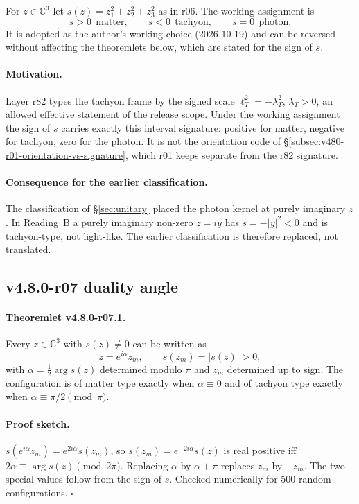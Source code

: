 For \(z\in\mathbb C^3\) let \(s(z)=z_1^2+z_2^2+z_3^2\) as in r06.  The working assignment is
\[
s>0\ \ \text{matter},\qquad s<0\ \ \text{tachyon},\qquad s=0\ \ \text{photon}.
\]
It is adopted as the author's working choice (2026-10-19) and can be reversed without affecting
the theoremlets below, which are stated for the sign of \(s\).

\paragraph{Motivation.}
Layer r82 types the tachyon frame by the signed scale \(\ell_T^2=-\lambda_T^2\), \(\lambda_T>0\),
an allowed effective statement of the release scope.  Under the working assignment the sign of
\(s\) carries exactly this interval signature: positive for matter, negative for tachyon, zero for
the photon.  It is not the orientation code of
\S\ref{subsec:v480-r01-orientation-vs-signature}, which r01 keeps separate from the r82 signature.

\paragraph{Consequence for the earlier classification.}
The classification of \S\ref{sec:unitary} placed the photon kernel at purely imaginary \(z\).  In
Reading~B a purely imaginary non-zero \(z=iy\) has \(s=-|y|^2<0\) and is tachyon-type, not
light-like.  The earlier classification is therefore replaced, not translated.

\subsection*{v4.8.0-r07 duality angle}
\label{subsec:v480-r07-duality-angle}

\paragraph{Theoremlet v4.8.0-r07.1.}
Every \(z\in\mathbb C^3\) with \(s(z)\neq0\) can be written as
\[
z=e^{i\alpha}z_m,\qquad s(z_m)=|s(z)|>0,
\]
with \(\alpha=\tfrac12\arg s(z)\) determined modulo \(\pi\) and \(z_m\) determined up to sign.
The configuration is of matter type exactly when \(\alpha\equiv0\) and of tachyon type exactly when
\(\alpha\equiv\pi/2\pmod\pi\).

\paragraph{Proof sketch.}
\(s(e^{i\alpha}z_m)=e^{2i\alpha}s(z_m)\), so \(s(z_m)=e^{-2i\alpha}s(z)\) is real positive iff
\(2\alpha\equiv\arg s(z)\pmod{2\pi}\).  Replacing \(\alpha\) by \(\alpha+\pi\) replaces \(z_m\) by
\(-z_m\).  The two special values follow from the sign of \(s\).  Checked numerically for 500 random
configurations.  \(\square\)

